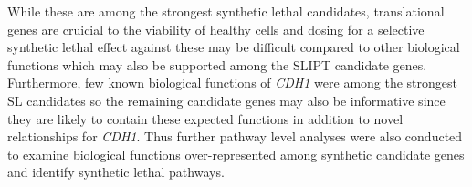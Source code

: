 While these are among the strongest synthetic lethal candidates, translational genes are cruicial to the viability of healthy cells and dosing for a selective synthetic lethal effect against these may be difficult compared to other biological functions which may also be supported among the SLIPT candidate genes. Furthermore, few known biological functions of \textit{CDH1} were among the strongest SL candidates so the remaining candidate genes may also be informative since they are likely to contain these expected functions in addition to novel relationships for \textit{CDH1}. Thus further pathway level analyses were also conducted to examine biological functions over-represent\-ed among synthetic candidate genes and identify synthetic lethal pathways.

\begin{table}[!ht]
\caption{Candidate synthetic lethal gene partners of \textit{CDH1} from SLIPT}
\label{tab:gene_SL}
\centering
{}
\end{table}

